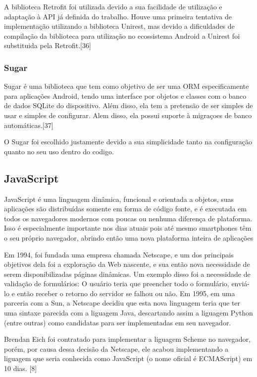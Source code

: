 \documentclass[
	article,			%
	11pt,				%
	oneside,			%
	a4paper,			%
	english,			%
	brazil,				%
	sumario=tradicional
	]{abntex2}
\begin{document}
A biblioteca Retrofit foi utilizada devido a sua facilidade de utilização e
adaptação à API já definida do trabalho. Houve uma primeira tentativa de
implementação utilizando a biblioteca Unirest, mas devido a dificuldades de
compilação da biblioteca para utilização no ecossistema Android a Unirest foi
substituida pela Retrofit.[36]

\subsubsection{Sugar}

Sugar é uma biblioteca que tem como objetivo de ser uma ORM especificamente para
aplicações Android, tendo uma interface por objetos e classes com o banco de dados
SQLite do dispositivo. Além disso, ela tem a pretensão de ser simples de usar e
simples de configurar. Alem disso, ela possui suporte à migraçoes de banco
automáticas.[37]

O Sugar foi escolhido justamente devido a sua simplicidade tanto na configuração
quanto no seu uso dentro do codigo.

\subsection{JavaScript}

JavaScript é uma linguagem dinâmica, funcional e orientada a objetos, suas
aplicações são distribuídas somente em forma de código fonte, e é executada em
todos os navegadores modernos com poucas ou nenhuma diferença de plataforma.
Isso é especialmente importante nos dias atuais pois até mesmo smartphones têm
o seu próprio navegador, abrindo então uma nova plataforma inteira de aplicações

Em 1994, foi fundada uma empresa chamada Netscape, e um dos principais objetivos
dela foi a exploração da Web nascente, e sua então nova necessidade de serem
disponibilizadas páginas dinâmicas. Um exemplo disso foi a necessidade de
validação de formulários: O usuário teria que preencher todo o formulário,
enviá-lo e então receber o retorno do servidor se falhou ou não. Em 1995, em uma
parceria com a Sun, a Netscape decidiu que esta nova linguagem teria que ter uma
sintaxe parecida com a liguagem Java, descartando assim a liguagem Python
(entre outras) como candidatas para ser implementadas em seu navegador.

Brendan Eich foi contratado para implementar a liguagem Scheme no navegador,
porém, por causa dessa decisão da Netscape, ele acabou implementando a liguagem
que seria conhecida como JavaScript (o nome oficial é ECMAScript) em 10 dias. [8]
\end{document}
